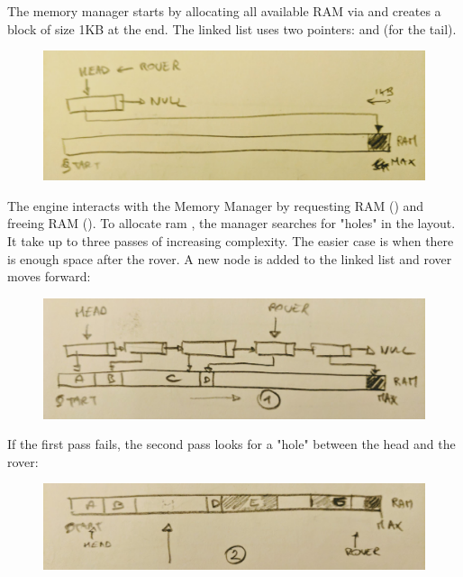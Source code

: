 \documentclass[book.tex]{subfiles}
\begin{document}
The memory manager starts by allocating all available RAM via  and creates a  block of size 1KB at the end. The linked list uses two pointers:  and  (for the tail).
 \par
\begin{figure}[H]
\centering
 \includegraphics[width=\textwidth]{imgs/mm_start.png}
 \end{figure}
 \par
 The engine interacts with the Memory Manager by requesting RAM () and freeing RAM (). To allocate ram , the manager searches for "holes" in the layout. It take up to three passes of increasing complexity. The easier case is when there is enough space after the rover. A new node is added to the linked list and rover moves forward:\\
  \par
\begin{figure}[H]
\centering
 \includegraphics[width=\textwidth]{imgs/mm_after_rover.png}
 \end{figure}
 \par
 If the first pass fails, the second pass looks for a "hole" between the head and the rover:\\
  \par
\begin{figure}[H]
\centering
 \includegraphics[width=\textwidth]{imgs/mm_before_rover.png}
 \end{figure}
\end{document}
